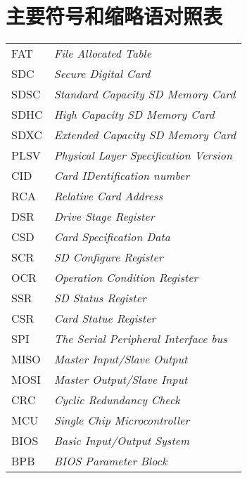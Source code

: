 
\chapter{主要符号和缩略语对照表}
\label{chap:symb}

\begin{longtable}{ll}
    FAT & \textit{ File Allocated Table}\\
    SDC & \textit{ Secure Digital Card}\\
    SDSC & \textit{ Standard Capacity SD Memory Card}\\
    SDHC & \textit{ High Capacity SD Memory Card}\\
    SDXC & \textit{ Extended Capacity SD Memory Card}\\
    PLSV & \textit{ Physical Layer Specification Version}\\
    CID & \textit{ Card IDentification number}\\
    RCA & \textit{ Relative Card Address}\\
    DSR & \textit{ Drive Stage Register}\\
    CSD & \textit{ Card Specification Data}\\
    SCR & \textit{ SD Configure Register}\\
    OCR & \textit{ Operation Condition Register}\\
    SSR & \textit{ SD Status Register}\\
    CSR & \textit{ Card Statue Register}\\
    SPI & \textit{ The Serial Peripheral Interface bus}\\
    MISO & \textit{ Master Input/Slave Output}\\
    MOSI & \textit{ Master Output/Slave Input}\\
    CRC & \textit{ Cyclic Redundancy Check}\\
    MCU & \textit{ Single Chip Microcontroller}\\
    BIOS & \textit{ Basic Input/Output System }\\
    BPB & \textit{ BIOS Parameter Block}
\end{longtable}

